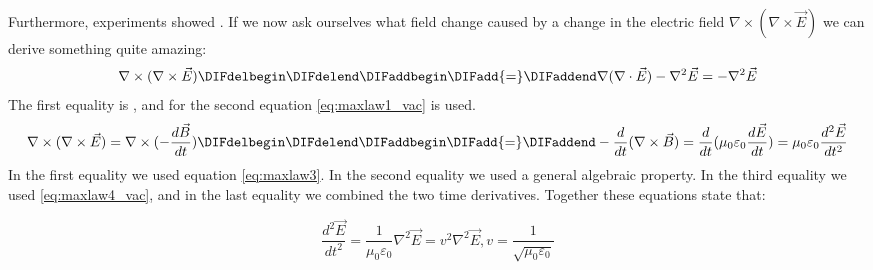 Furthermore, experiments showed \DIFdelbegin {}\DIFdelend \DIFaddbegin {}\DIFaddend . If we now ask ourselves
what \DIFaddbegin {}\DIFaddend field change caused by a change in the electric field \DIFdelbegin \DIFdel{(}\DIFdelend \DIFaddbegin {}\DIFaddend $\nabla \times( \nabla \times \vec{E}) $ \DIFdelbegin \DIFdel{) }\DIFdelend we can
derive something quite amazing:
\[ \nabla \times( \nabla \times \vec{E}) \DIFdelbegin %
\DIFdelend \DIFaddbegin \DIFadd{= }\DIFaddend \nabla (\nabla \cdot
\vec{E}) -\nabla^2 \vec{E} =-\nabla^2 \vec{E} \] The first equality is
\DIFdelbegin {}\DIFdelend \DIFaddbegin {}\DIFaddend , and for the second \DIFaddbegin {}\DIFaddend equation \ref{eq:maxlaw1_vac} is used. \DIFdelbegin {}\DIFdelend \DIFaddbegin {}\DIFaddend \[\nabla \times( \nabla \times \vec{E})=
\nabla\times(-\frac{d\vec{B}}{dt}) \DIFdelbegin %
\DIFdelend \DIFaddbegin \DIFadd{=
}\DIFaddend -\frac{d}{dt}(\nabla\times\vec{B})=\frac{d}{dt}(\mu_0\varepsilon_0\frac{d\vec{E}}{dt})
= \mu_0\varepsilon_0\frac{d^2\vec{E}}{dt^2}\] In the first equality we
used equation \ref{eq:maxlaw3}. In the second equality we used a
general algebraic property. In the third equality we used
\ref{eq:maxlaw4_vac}, and in the last equality we combined the two
time derivatives. Together these equations state that:

\begin{equation}\label{eq:wave_eq}
\frac{d^2\vec{E}}{dt^2} = \frac{1}{\mu_0\varepsilon_0}\nabla^2 \vec{E} = v^2 \nabla^2 \vec{E},      v = \frac{1}{\sqrt{\mu_0\varepsilon_0}}
\end{equation}

